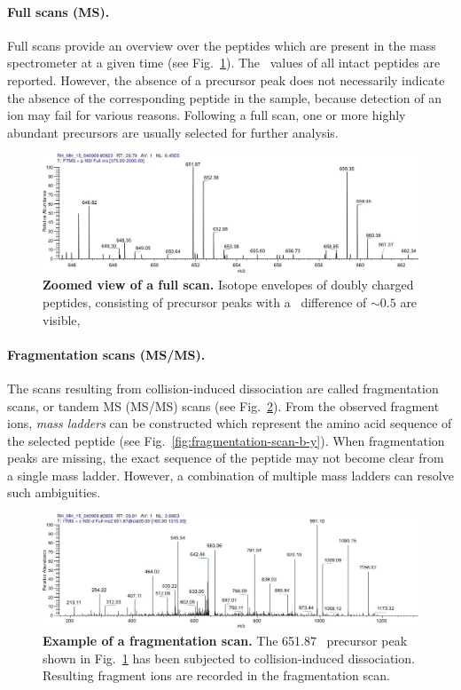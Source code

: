 \paragraph{Full scans (MS).}

Full scans provide an overview over the peptides which are present in the
mass spectrometer at a given time (see Fig.~\ref{fig:full-scan}).
The \mz~values of all intact peptides are reported.
However, the absence of a precursor peak does not necessarily indicate the
absence of the corresponding peptide in the sample, because detection of
an ion may fail for various reasons.
Following a full scan, one or more highly abundant precursors are usually
selected for further analysis.

\begin{figure}
\includegraphics[width=\textwidth]{figures/ms1-scan.jpg}
\caption{
{\bf Zoomed view of a full scan.}
Isotope envelopes of doubly charged peptides, consisting of precursor
peaks with a \mz~difference of $\sim0.5$ are visible,
}
\label{fig:full-scan}
\end{figure}

\paragraph{Fragmentation scans (MS/MS).}

The scans resulting from collision-induced dissociation are called 
fragmentation scans, or tandem MS (MS/MS) scans (see Fig.~\ref{fig:fragmentation-scan}).
From the observed fragment ions, {\em mass ladders} can be constructed which
represent the amino acid sequence of the selected peptide (see Fig.~\ref{fig:fragmentation-scan-b-y}). 
When fragmentation peaks are missing, the exact sequence of the peptide may not
become clear from a single mass ladder.
However, a combination of multiple mass ladders can resolve such ambiguities.

\begin{figure}
\includegraphics[width=\textwidth]{figures/ms2-scan.jpg}
\caption{
{\bf Example of a fragmentation scan.} 
The 651.87 \mz~precursor peak shown in Fig.~\ref{fig:full-scan} has been
subjected to collision-induced dissociation.
Resulting fragment ions are recorded in the fragmentation scan.
}
\label{fig:fragmentation-scan}
\end{figure}

